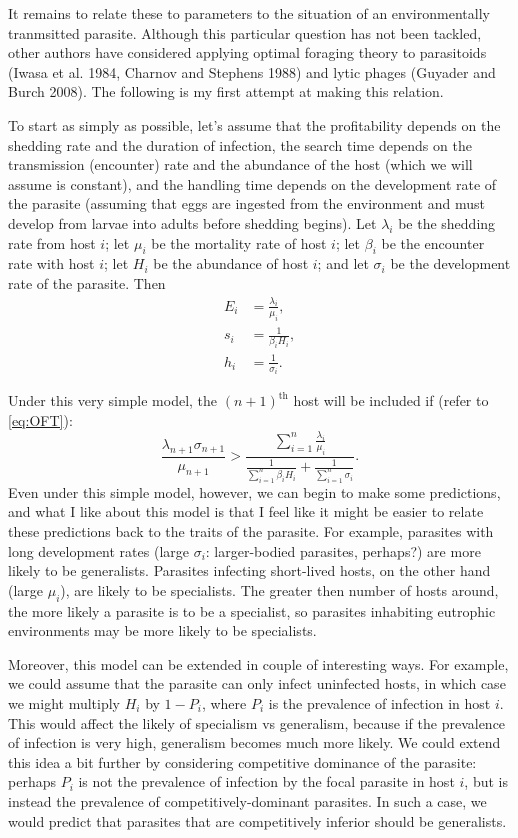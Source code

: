\documentclass[11pt,reqno,final,pdftex]{amsart}\usepackage[]{graphicx}\usepackage[]{color}
\theoremstyle{plain}
\numberwithin{equation}{part}
\begin{document}
It remains to relate these to parameters to the situation of an environmentally tranmsitted parasite.
Although this particular question has not been tackled, other authors have considered applying optimal foraging theory to parasitoids (Iwasa et al. 1984, Charnov and Stephens 1988) and lytic phages (Guyader and Burch 2008).
The following is my first attempt at making this relation.

To start as simply as possible, let's assume that the profitability depends on the shedding rate and the duration of infection, the search time depends on the transmission (encounter) rate and the abundance of the host (which we will assume is constant), and the handling time depends on the development rate of the parasite (assuming that eggs are ingested from the environment and must develop from larvae into adults before shedding begins).
Let $\lambda_i$ be the shedding rate from host $i$; let $\mu_i$ be the mortality rate of host $i$; let $\beta_i$ be the encounter rate with host $i$; let $H_i$ be the abundance of host $i$; and let $\sigma_i$ be the development rate of the parasite.
Then
\begin{align}
E_i &= \frac{\lambda_i}{\mu_i}, \\
s_i &= \frac{1}{\beta_i H_i}, \\
h_i &= \frac{1}{\sigma_i}.
\end{align}

Under this very simple model, the $(n+1)^{\text{th}}$ host will be included if (refer to \ref{eq:OFT}):
\begin{equation}
\frac{\lambda_{n+1} \sigma_{n+1}}{\mu_{n+1}} > \frac{\sum_{i=1}^n \frac{\lambda_i}{\mu_i}}{\frac{1}{\sum_{i=1}^n \beta_i H_i} + \frac{1}{\sum_{i=1}^n \sigma_i}}.
\end{equation}
Even under this simple model, however, we can begin to make some predictions, and what I like about this model is that I feel like it might be easier to relate these predictions back to the traits of the parasite.
For example, parasites with long development rates (large $\sigma_i$: larger-bodied parasites, perhaps?) are more likely to be generalists.
Parasites infecting short-lived hosts, on the other hand (large $\mu_i$), are likely to be specialists.
The greater then number of hosts around, the more likely a parasite is to be a specialist, so parasites inhabiting eutrophic environments may be more likely to be specialists.

Moreover, this model can be extended in couple of interesting ways.
For example, we could assume that the parasite can only infect uninfected hosts, in which case we might multiply $H_i$ by $1-P_i$, where $P_i$ is the prevalence of infection in host $i$.
This would affect the likely of specialism vs generalism, because if the prevalence of infection is very high, generalism becomes much more likely.
We could extend this idea a bit further by considering competitive dominance of the parasite: perhaps $P_i$ is not the prevalence of infection by the focal parasite in host $i$, but is instead the prevalence of competitively-dominant parasites.
In such a case, we would predict that parasites that are competitively inferior should be generalists.
\end{document}
